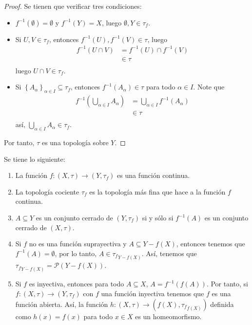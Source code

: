 \documentclass[12pt]{report}
\theoremstyle{largebreak}
\newcommand\cf[3]{\ensuremath{#1:#2\rightarrow#3}}
\begin{document}
    \begin{proof}
        Se tienen que verificar tres condiciones:
        \begin{itemize}
            \item $f^{-1}(\emptyset)=\emptyset$ y $f^{-1}(Y)=X$, luego $\emptyset,Y\in\tau_f$.
            \item Si $U,V\in\tau_f$, entonces $f^{-1}(U),f^{-1}(V)\in\tau$, luego
            \begin{equation*}
                \begin{split}
                    f^{-1}(U\cap V)&=f^{-1}(U)\cap f^{-1}(V)\\
                    &\in\tau\\
                \end{split}
            \end{equation*}
            luego $U\cap V\in\tau_f$.
            \item Si $\left\{A_\alpha\right\}_{\alpha\in I}\subseteq\tau_f$, entonces $f^{-1}(A_\alpha)\in\tau$ para todo $\alpha\in I$. Note que
            \begin{equation*}
                \begin{split}
                    f^{-1}\left(\bigcup_{\alpha\in I}A_\alpha \right)&=\bigcup_{\alpha\in I}f^{-1}(A_\alpha)\\
                    &\in\tau\\
                \end{split}
            \end{equation*}
            así, $\bigcup_{\alpha\in I}A_\alpha\in\tau_f$.
        \end{itemize}
        Por tanto, $\tau$ es una topología sobre $Y$.
    \end{proof}

    \begin{obs}
        Se tiene lo siguiente:
        \begin{enumerate}
            \item La función $\cf{f}{(X,\tau)}{(Y,\tau_f)}$ es una función continua.
            \item La topología cociente $\tau_f$ es la topología más fina que hace a la función $f$ continua.
            \item $A\subseteq Y$ es un conjunto cerrado de $(Y,\tau_f)$ si y sólo si $f^{-1}(A)$ es un conjunto cerrado de $(X,\tau)$.
            \item Si $f$ no es una función suprayectiva y $A\subseteq Y-f(X)$, entonces tenemos que $f^{-1}(A)=\emptyset$, por lo tanto, $A\in{\tau_f}_{Y-f(X)}$. Así, tenemos que ${\tau_f}_{ Y-f(X)}=\mathcal{P}(Y-f(X))$.
            \item Si $f$ es inyectiva, entonces para todo $A\subseteq X$, $A=f^{-1}(f(A))$. Por tanto, si $\cf{f}{(X,\tau)}{(Y,\tau_f)}$ con $f$ una función inyectiva tenemos que $f$ es una función abierta. Así, la función $\cf{h}{(X,\tau)}{(f(X),{\tau_f}_{f(X)})}$ definida como $h(x)=f(x)$ para todo $x\in X$ es un homeomorfismo.
        \end{enumerate}
    \end{obs}
\end{document}
